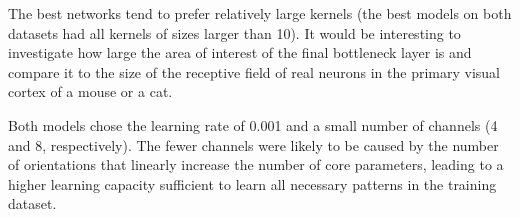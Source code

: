 The best networks tend to prefer relatively large kernels (the best models on both datasets had all kernels of sizes larger than 10). It would be interesting to investigate how large the area of interest of the final bottleneck layer is and compare it to the size of the receptive field of real neurons in the primary visual cortex of a mouse or a cat.

Both models chose the learning rate of 0.001 and a small number of channels (4 and 8, respectively). The fewer channels were likely to be caused by the number of orientations that linearly increase the number of core parameters, leading to a higher learning capacity sufficient to learn all necessary patterns in the training dataset.


